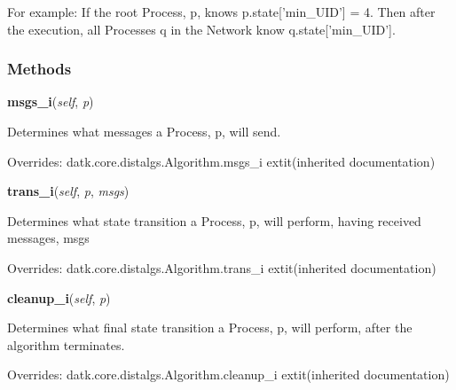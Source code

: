 For example: If the root Process, p, knows p.state['min\_UID'] = 4. Then 
after the execution, all Processes q in the Network know 
q.state['min\_UID'].



  \subsubsection{Methods}

    \vspace{0.5ex}

\hspace{.8\funcindent}\begin{boxedminipage}{\funcwidth}

    \raggedright \textbf{msgs\_i}(\textit{self}, \textit{p})

\setlength{\parskip}{2ex}
    Determines what messages a Process, p, will send.

\setlength{\parskip}{1ex}
      Overrides: datk.core.distalgs.Algorithm.msgs\_i 	extit{(inherited documentation)}

    \end{boxedminipage}

    \vspace{0.5ex}

\hspace{.8\funcindent}\begin{boxedminipage}{\funcwidth}

    \raggedright \textbf{trans\_i}(\textit{self}, \textit{p}, \textit{msgs})

\setlength{\parskip}{2ex}
    Determines what state transition a Process, p, will perform, having 
    received messages, msgs

\setlength{\parskip}{1ex}
      Overrides: datk.core.distalgs.Algorithm.trans\_i 	extit{(inherited documentation)}

    \end{boxedminipage}

    \vspace{0.5ex}

\hspace{.8\funcindent}\begin{boxedminipage}{\funcwidth}

    \raggedright \textbf{cleanup\_i}(\textit{self}, \textit{p})

\setlength{\parskip}{2ex}
    Determines what final state transition a Process, p, will perform, 
    after the algorithm terminates.

\setlength{\parskip}{1ex}
      Overrides: datk.core.distalgs.Algorithm.cleanup\_i 	extit{(inherited documentation)}

    \end{boxedminipage}


